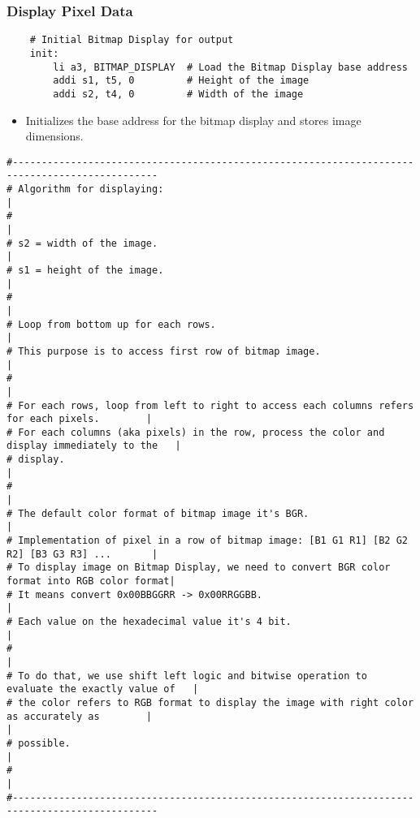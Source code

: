 \documentclass{article}
\begin{document}
\subsubsection{Display Pixel Data}
\begin{verbatim}
    # Initial Bitmap Display for output
    init:
        li a3, BITMAP_DISPLAY  # Load the Bitmap Display base address
        addi s1, t5, 0         # Height of the image
        addi s2, t4, 0         # Width of the image
\end{verbatim}
\begin{itemize}
    \item Initializes the base address for the bitmap display and stores image dimensions.
\end{itemize}
\begin{verbatim}
#-----------------------------------------------------------------------------------------------
# Algorithm for displaying:                                                                    |
#                                                                                              |
# s2 = width of the image.                                                                     |
# s1 = height of the image.                                                                    |
#                                                                                              |
# Loop from bottom up for each rows.                                                           |
# This purpose is to access first row of bitmap image.                                         |
#                                                                                              | 
# For each rows, loop from left to right to access each columns refers for each pixels.        |
# For each columns (aka pixels) in the row, process the color and display immediately to the   | 
# display.                                                                                     |
#                                                                                              |
# The default color format of bitmap image it's BGR.                                           |
# Implementation of pixel in a row of bitmap image: [B1 G1 R1] [B2 G2 R2] [B3 G3 R3] ...       |
# To display image on Bitmap Display, we need to convert BGR color format into RGB color format|
# It means convert 0x00BBGGRR -> 0x00RRGGBB.                                                   |
# Each value on the hexadecimal value it's 4 bit.                                              |
#                                                                                              |
# To do that, we use shift left logic and bitwise operation to evaluate the exactly value of   |
# the color refers to RGB format to display the image with right color as accurately as        |                                                                            |
# possible.                                                                                    |
#                                                                                              |
#-----------------------------------------------------------------------------------------------
\end{verbatim}
\end{document}
